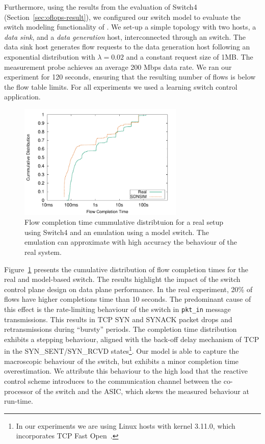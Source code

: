 Furthermore, using the results from the evaluation of Switch4 (Section~\ref{sec:oflops-result}),
we configured our switch model to evaluate the switch modeling functionality of \sdnsim.
We set-up a simple topology with two hosts, a \textit{data sink}, and a \textit{data generation} host,
interconnected through an \of switch. The data sink host generates flow
requests to the data generation host following an exponential distribution with
$\lambda=0.02$ and a constant request size of 1MB\@. The measurement probe achieves an average
200 Mbps data rate. We ran our experiment for 120 seconds, ensuring that the
resulting number of flows is below the flow table limits. For all experiments we
used a learning switch control application.

\begin{figure}[t] 
  \centering
  \includegraphics[width=0.70\textwidth]{Chapter1/Chapter1Figs/2hosts-cumm} 
  \caption{Flow completion time cummulative distribtuion for a real setup using
      Switch4 and an \sdnsim emulation using a model switch. The \sdnsim emulation
  can approximate with high accuracy the behaviour of the real system.} 
  \label{fig:eval:switch-perf} 
\end{figure}


Figure~\ref{fig:eval:switch-perf} presents the cumulative distribution of flow
completion times for the real and model-based switch. The results highlight the
impact of the switch control plane design on data plane performance.  In the
real experiment, 20\% of flows have higher completions time than 10 seconds.
The predominant cause of this effect is the rate-limiting behaviour of the
switch in \texttt{pkt\_in} message transmissions. This results in TCP SYN and
SYNACK packet drops and retransmissions during ``bursty'' periods. The
completion time distribution exhibits a stepping behaviour, aligned with the
back-off delay mechanism of TCP in the SYN\_SENT/SYN\_RCVD states\footnote{In
    our experiments we are using Linux hosts with kernel 3.11.0, which
incorporates TCP Fast Open~\cite{Cheng13}.}. Our model is able to capture the
macroscopic behaviour of the switch, but exhibits a minor completion time
overestimation. We attribute this behaviour to the high load that the reactive
control scheme introduces to the communication channel between the co-processor
of the switch and the ASIC, which skews the measured behaviour at run-time.

